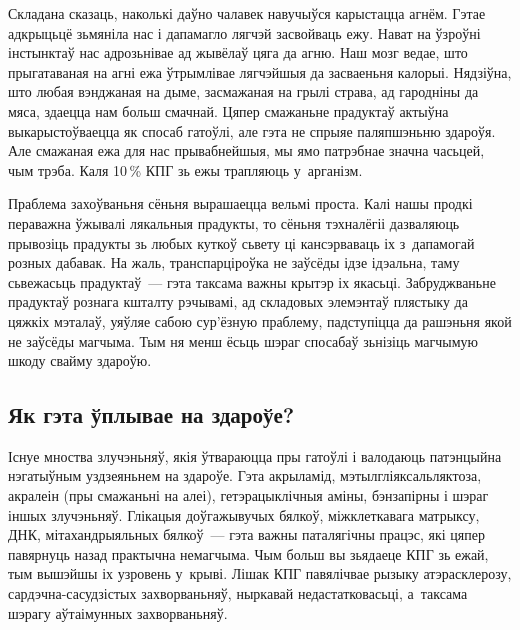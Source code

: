 Складана сказаць, наколькі даўно чалавек навучыўся карыстацца агнём. Гэтае адкрыцьцё зьмяніла нас і дапамагло лягчэй засвойваць ежу. Нават на ўзроўні інстынктаў нас адрозьнівае ад жывёлаў цяга да агню. Наш мозг ведае, што прыгатаваная на агні ежа ўтрымлівае лягчэйшыя да засваеньня калорыі. Нядзіўна, што любая вэнджаная на дыме, засмажаная на грылі страва, ад гародніны да мяса, здаецца нам больш смачнай. Цяпер смажаньне прадуктаў актыўна выкарыстоўваецца як спосаб гатоўлі, але гэта не спрыяе паляпшэньню здароўя. Але смажаная ежа для нас прывабнейшыя, мы ямо патрэбнае значна часьцей, чым трэба. Каля 10\,\% КПГ зь ежы трапляюць у~арганізм.


Праблема захоўваньня сёньня вырашаецца вельмі проста. Калі нашы продкі пераважна ўжывалі лякальныя прадукты, то сёньня тэхналёгіі дазваляюць прывозіць прадукты зь любых куткоў сьвету ці кансэрваваць іх з~дапамогай розных дабавак. На жаль, транспарціроўка не заўсёды ідзе ідэальна, таму сьвежасьць прадуктаў~--- гэта таксама важны крытэр іх якасьці. Забруджваньне прадуктаў рознага кшталту рэчывамі, ад складовых элемэнтаў плястыку да цяжкіх мэталаў, уяўляе сабою сур'ёзную праблему, падступіцца да рашэньня якой не заўсёды магчыма. Тым ня менш ёсьць шэраг спосабаў зьнізіць магчымую шкоду свайму здароўю.

\subsection{Як гэта ўплывае на здароўе?}

Існуе мноства злучэньняў, якія ўтвараюцца пры гатоўлі і валодаюць патэнцыйна нэгатыўным уздзеяньнем на здароўе. Гэта акрыламід, мэтылгліяксальляктоза, акралеін (пры смажаньні на алеі), гетэрацыклічныя аміны, бэнзапірны і шэраг іншых злучэньняў. Глікацыя доўгажывучых бялкоў, міжклеткавага матрыксу, ДНК, мітахандрыяльных бялкоў~--- гэта важны паталягічны працэс, які цяпер павярнуць назад практычна немагчыма. Чым больш вы зьядаеце КПГ зь ежай, тым вышэйшы іх узровень у~крыві. Лішак КПГ павялічвае рызыку атэрасклерозу, сардэчна-сасудзістых захворваньняў, ныркавай недастатковасьці, а~таксама шэрагу аўтаімунных захворваньняў.

